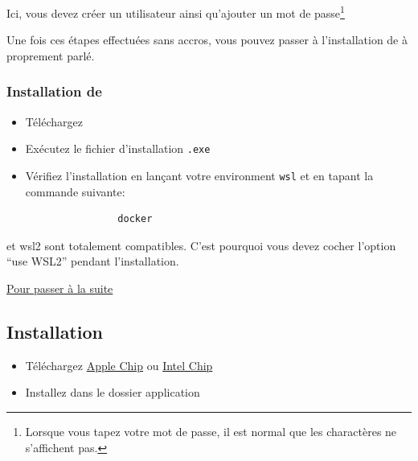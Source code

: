 \documentclass[internal]{nhitec_design}
\begin{document}
        Ici, vous devez créer un utilisateur ainsi qu'ajouter un mot de passe\footnote{Lorsque vous tapez votre mot de passe, il est normal que les charactères ne s'affichent pas.}

        Une fois ces étapes effectuées sans accros, vous pouvez passer à l'installation de \dockerdesktop à proprement parlé.

        \subsubsection[Installation de Docker Desktop]{Installation de \dockerdesktop}
        
        \begin{itemize}
            \item[1.] Téléchargez \href{https://desktop.docker.com/win/main/amd64/Docker%20Desktop%20Installer.exe}{\dockerdesktop{}}
            
            \item[2.] Exécutez le fichier d'installation \verb|.exe|
            
            \item[3.] Vérifiez l'installation en lançant votre environment \verb|wsl| et en tapant la commande suivante:
            \begin{lstlisting}
                docker
            \end{lstlisting}
        \end{itemize}

        \docker{} et wsl2 sont totalement compatibles. C'est pourquoi vous devez cocher l'option ``use WSL2'' pendant l'installation. 

        \hyperref[sec:suite]{Pour passer à la suite}

    \newpage
    \subsection[Installation MacOS]{Installation \macos{}\label{sec:installation_macos}}

        \begin{itemize}
            \item[1.] Téléchargez \dockerdesktop{} \href{https://desktop.docker.com/mac/main/arm64/Docker.dmg?utm_source=docker&utm_medium=webreferral&utm_campaign=dd-smartbutton&utm_location=module}{Apple Chip} ou \href{https://desktop.docker.com/mac/main/amd64/Docker.dmg?utm_source=docker&utm_medium=webreferral&utm_campaign=dd-smartbutton&utm_location=module}{Intel Chip}
            \item[2.] Installez \dockerdesktop{} dans le dossier application
        \end{itemize}
\end{document}
